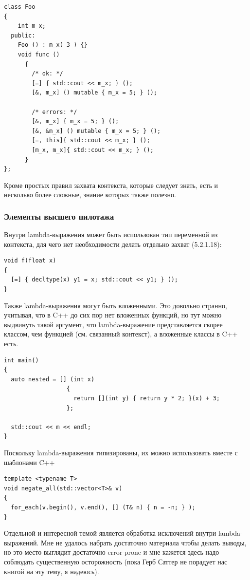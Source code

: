 \documentclass[a4paper,12pt,oneside]{article}
\begin{document}
\begin{lstlisting}
class Foo
{
    int m_x;
  public:
    Foo () : m_x( 3 ) {}
    void func ()
      {
        /* ok: */
        [=] { std::cout << m_x; } ();
        [&, m_x] () mutable { m_x = 5; } ();

        /* errors: */
        [&, m_x] { m_x = 5; } ();
        [&, &m_x] () mutable { m_x = 5; } ();
        [=, this]{ std::cout << m_x; } ();
        [m_x, m_x]{ std::cout << m_x; } ();
      }
};
\end{lstlisting}

Кроме простых правил захвата контекста, которые следует знать, есть и несколько более сложные, знание которых также полезно.

\subsubsection{Элементы высшего пилотажа}

Внутри lambda-выражения может быть использован тип переменной из контекста, для чего нет необходимости делать отдельно захват (5.2.1.18):

\begin{lstlisting}
void f(float x) 
{
  [=] { decltype(x) y1 = x; std::cout << y1; } ();
}
\end{lstlisting}

Также lambda-выражения могут быть вложенными. Это довольно странно, учитывая, что в C++ до сих пор нет вложенных функций, но тут можно выдвинуть такой аргумент, что lambda-выражение представляется скорее классом, чем функцией (см. связанный контекст), а вложенные классы в C++ есть.

\begin{lstlisting}
int main()
{
  auto nested = [] (int x) 
                  { 
                    return [](int y) { return y * 2; }(x) + 3; 
                  };

  std::cout << m << endl;
}
\end{lstlisting}

Поскольку lambda-выражения типизированы, их можно использовать вместе с шаблонами C++

\begin{lstlisting}
template <typename T> 
void negate_all(std::vector<T>& v)
{
  for_each(v.begin(), v.end(), [] (T& n) { n = -n; } );
}
\end{lstlisting}

Отдельной и интересной темой является обработка исключений внутри lambda-выражений. Мне не удалось набрать достаточно материала чтобы делать выводы, но это место выглядит достаточно error-prone и мне кажется здесь надо соблюдать существенную осторожность (пока Герб Саттер не порадует нас книгой на эту тему, я надеюсь).
\end{document}
